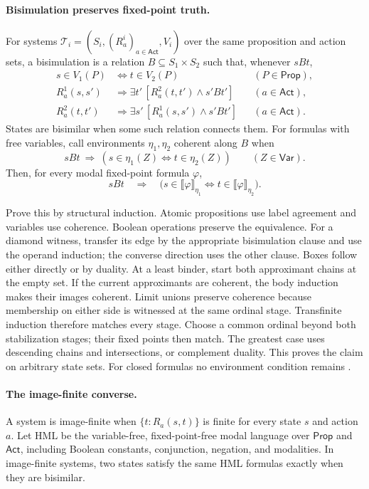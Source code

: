 \paragraph{Bisimulation preserves fixed-point truth.}
\label{sec:p09-mu-bisimulation-invariance}
For systems
\(\mathcal T_i=(S_i,(R_a^i)_{a\in\mathsf{Act}},V_i)\)
over the
same proposition and action sets, a bisimulation is
a relation \(B\subseteq S_1\times S_2\) such that,
whenever \(sBt\),
\[
\begin{aligned}
 s\in V_1(P)&\iff t\in V_2(P)
                         &&(P\in\mathsf{Prop}),\\
 R_a^1(s,s')&\Rightarrow
       \exists t'\,[R_a^2(t,t')\land s'Bt']
                         &&(a\in\mathsf{Act}),\\
 R_a^2(t,t')&\Rightarrow
       \exists s'\,[R_a^1(s,s')\land s'Bt']
                         &&(a\in\mathsf{Act}).
\end{aligned}
\]
States are bisimilar when some such relation connects them.
For formulas with free variables, call environments
\(\eta_1,\eta_2\) coherent along \(B\) when
\[
 sBt\ \Longrightarrow\
   (s\in\eta_1(Z)\iff t\in\eta_2(Z))
       \qquad(Z\in\mathsf{Var}).
\]
Then, for every modal fixed-point formula \(\varphi\),
\[
 sBt\quad\Longrightarrow\quad
 \bigl(s\in\llbracket\varphi\rrbracket_{\eta_1}
       \iff t\in\llbracket\varphi\rrbracket_{\eta_2}\bigr).
\]

Prove this by structural induction. Atomic propositions
use label agreement and variables use coherence.
Boolean operations preserve the equivalence. For a
diamond witness, transfer its edge by the appropriate
bisimulation clause and use the operand induction;
the converse direction uses the other clause.
Boxes follow either directly or by duality.
At a least binder, start both approximant chains at
the empty set. If the current approximants are
coherent, the body induction makes their images
coherent. Limit unions preserve coherence because
membership on either side is witnessed at the same
ordinal stage. Transfinite induction therefore
matches every stage. Choose a common ordinal beyond
both stabilization stages; their fixed points then
match. The greatest case uses descending chains
and intersections, or complement duality.
This proves the claim on arbitrary state sets.
For closed formulas no environment condition remains
\cite[\S4.2, thms.~4.1--4.2]{BradfieldStirling2007}.

\paragraph{The image-finite converse.}
A system is image-finite when
\(\{t:R_a(s,t)\}\) is finite for every state \(s\)
and action \(a\). Let \(\mathrm{HML}\) be the
variable-free, fixed-point-free modal language over
\(\mathsf{Prop}\) and \(\mathsf{Act}\), including Boolean
constants, conjunction, negation, and modalities.
In image-finite systems, two states satisfy the
same HML formulas exactly when they are bisimilar.

